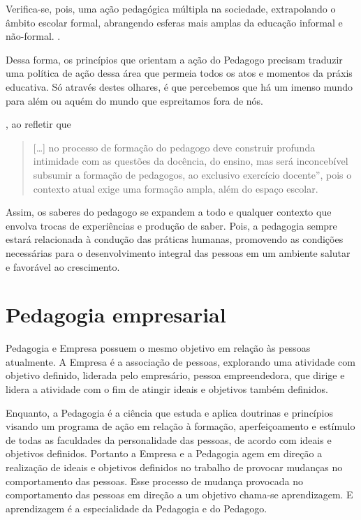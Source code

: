 \begin{refsection}
 

    Verifica-se, pois, uma ação pedagógica múltipla na sociedade, extrapolando o âmbito escolar formal, abrangendo esferas mais amplas da educação informal e não-formal. \cite{LIBÂNEO2005campo}. 

    Dessa forma, os princípios que orientam a ação do Pedagogo precisam traduzir uma política de ação dessa área que permeia todos os atos e momentos da práxis educativa. Só através destes olhares, é que percebemos que há um imenso mundo para além ou aquém do mundo que espreitamos fora de nós.  

    \textcite[p.~124]{FRANCO2008Pedagogia}, ao refletir que  

    \begin{quotation}
        [\dots] no processo de formação do pedagogo deve construir profunda intimidade com as questões da docência, do ensino, mas será inconcebível subsumir a formação de pedagogos, ao exclusivo exercício docente”, pois o contexto atual exige uma formação ampla, além do espaço escolar.   
    \end{quotation}

    Assim, os saberes do pedagogo se expandem a todo e qualquer contexto que envolva trocas de experiências e produção de saber. Pois, a pedagogia sempre estará relacionada à condução das práticas humanas, promovendo as condições necessárias para o desenvolvimento integral das pessoas em um ambiente salutar e favorável ao crescimento. 

    \section{Pedagogia empresarial}

    Pedagogia e Empresa possuem o mesmo objetivo em relação às pessoas atualmente. A Empresa é a associação de pessoas, explorando uma atividade com objetivo definido, liderada pelo empresário, pessoa empreendedora, que dirige e lidera a atividade com o fim de atingir ideais e objetivos também definidos. 

    Enquanto, a Pedagogia é a ciência que estuda e aplica doutrinas e princípios visando um programa de ação em relação à formação, aperfeiçoamento e estímulo de todas as faculdades da personalidade das pessoas, de acordo com ideais e objetivos definidos. Portanto a Empresa e a Pedagogia agem em direção a realização de ideais e objetivos definidos no trabalho de provocar mudanças no comportamento das pessoas. Esse processo de mudança provocada no comportamento das pessoas em direção a um objetivo chama-se aprendizagem. E aprendizagem é a especialidade da Pedagogia e do Pedagogo. 


\end{refsection}
